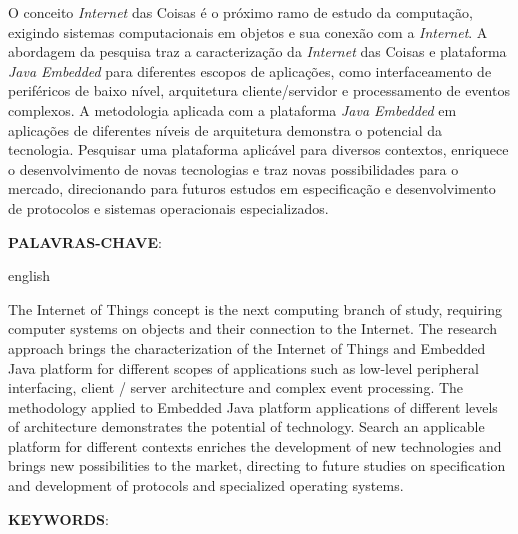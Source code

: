 \begin{resumo}

	O conceito \textit{Internet} das Coisas é o próximo ramo de estudo da computação, exigindo sistemas computacionais em objetos e sua conexão com a \textit{Internet}.
	A abordagem da pesquisa traz a caracterização da \textit{Internet} das Coisas e plataforma \textit{Java Embedded} para diferentes escopos de aplicações, como interfaceamento de periféricos de baixo nível, arquitetura cliente/servidor e processamento de eventos complexos.
	A metodologia aplicada com a plataforma \textit{Java Embedded} em aplicações de diferentes níveis de arquitetura demonstra o potencial da tecnologia.
	Pesquisar uma plataforma aplicável para diversos contextos, enriquece o desenvolvimento de novas tecnologias e traz novas possibilidades para o mercado, direcionando para futuros estudos em especificação e desenvolvimento de protocolos e sistemas operacionais especializados.

	\vspace{\onelineskip}
	\noindent
	\textbf{\uppercase{Palavras-chave}}: \palavraschave

\end{resumo}

\begin{resumo}[Abstract]

	\begin{otherlanguage*}{english}

		The Internet of Things concept is the next computing branch of study, requiring computer systems on objects and their connection to the Internet.
		The research approach brings the characterization of the Internet of Things and Embedded Java platform for different scopes of applications such as low-level peripheral interfacing, client / server architecture and complex event processing.
		The methodology applied to Embedded Java platform applications of different levels of architecture demonstrates the potential of technology.
		Search an applicable platform for different contexts enriches the development of new technologies and brings new possibilities to the market, directing to future studies on specification and development of protocols and specialized operating systems.

		\vspace{\onelineskip}
		\noindent
		\textbf{\uppercase{Keywords}}: \keywords

	\end{otherlanguage*}

\end{resumo}
